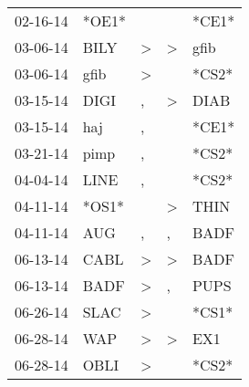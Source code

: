 \begin{supertabular}{p{0.07\textwidth}p{0.06\textwidth}p{0.02\textwidth}p{0.02\textwidth}p{0.06\textwidth}}
          02-16-14\textsuperscript{} &                            *OE1* &                  &                  &                            *CE1* \\
          03-06-14\textsuperscript{} &           BILY\textsuperscript{} &     \textgreater &     \textgreater &           gfib\textsuperscript{} \\
          03-06-14\textsuperscript{} &           gfib\textsuperscript{} &     \textgreater &                  &                            *CS2* \\
          03-15-14\textsuperscript{} &           DIGI\textsuperscript{} &                , &     \textgreater &           DIAB\textsuperscript{} \\
          03-15-14\textsuperscript{} &            haj\textsuperscript{} &                , &                  &                            *CE1* \\
          03-21-14\textsuperscript{} &           pimp\textsuperscript{} &                , &                  &                            *CS2* \\
          04-04-14\textsuperscript{} &           LINE\textsuperscript{} &                , &                  &                            *CS2* \\
          04-11-14\textsuperscript{} &                            *OS1* &                  &     \textgreater &           THIN\textsuperscript{} \\
          04-11-14\textsuperscript{} &            AUG\textsuperscript{} &                , &                , &           BADF\textsuperscript{} \\
          06-13-14\textsuperscript{} &           CABL\textsuperscript{} &     \textgreater &     \textgreater &           BADF\textsuperscript{} \\
          06-13-14\textsuperscript{} &           BADF\textsuperscript{} &     \textgreater &                , &           PUPS\textsuperscript{} \\
          06-26-14\textsuperscript{} &           SLAC\textsuperscript{} &     \textgreater &                  &                            *CS1* \\
          06-28-14\textsuperscript{} &            WAP\textsuperscript{} &     \textgreater &     \textgreater &            EX1\textsuperscript{} \\
          06-28-14\textsuperscript{} &           OBLI\textsuperscript{} &     \textgreater &                  &                            *CS2* \\

\end{supertabular}
